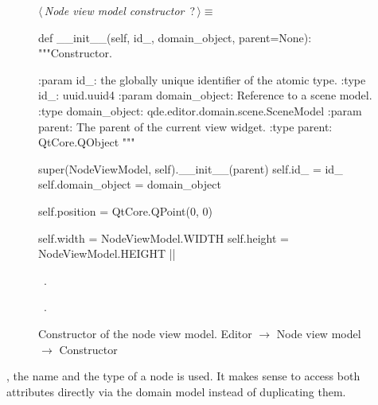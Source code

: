 \documentclass[%
    a4paper,    %
    justified,  %
    nobib,      %
    openany     %
]{tufte-book}
\makeatletter
\renewcommand{\label}[1]{\@tufte@label{##1}}%
\makeatother
\begin{document}
\begin{figure}
\begin{flushleft} \small
\begin{minipage}{\linewidth}\label{scrap69}\raggedright\small
{} $\langle\,${\itshape Node view model constructor}\nobreak\ {\footnotesize {?}}$\,\rangle\equiv$
\vspace{-1ex}
\begin{pythoncode}
def __init__(self, id_, domain_object, parent=None):
    """Constructor.

    :param id_: the globally unique identifier of the atomic type.
    :type  id_: uuid.uuid4
    :param domain_object: Reference to a scene model.
    :type  domain_object: qde.editor.domain.scene.SceneModel
    :param parent: The parent of the current view widget.
    :type parent:  QtCore.QObject
    """

    super(NodeViewModel, self).__init__(parent)
    self.id_ = id_
    self.domain_object = domain_object

    self.position = QtCore.QPoint(0, 0)

    self.width  = NodeViewModel.WIDTH
    self.height = NodeViewModel.HEIGHT
|\NWsep|
\end{pythoncode}
\vspace{1.5ex}
\footnotesize
\begin{list}{}{\setlength{\itemsep}{-\parsep}\setlength{\itemindent}{-\leftmargin}}
\item \NWtxtMacroDefBy\ .
\item \NWtxtMacroRefIn\ .

\item{}
\end{list}
\end{minipage}\vspace{4ex}
\end{flushleft}
\caption{Constructor of the node view model.
  \newline{}\newline{}Editor $\rightarrow$ Node view model $\rightarrow$
  Constructor}
\label{editor:lst:node-view-model:constructor}
\end{figure}

, the name and the type of a node is used. It
makes sense to access both attributes directly via the domain model instead of
duplicating them.
\end{document}
